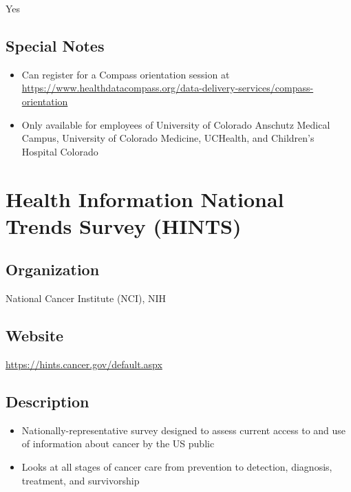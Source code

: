 \documentclass[
]{book}
\providecommand{\tightlist}{%
  \setlength{\itemsep}{0pt}\setlength{\parskip}{0pt}}
\begin{document}
Yes

\hypertarget{special-notes-30}{%
\section{Special Notes}\label{special-notes-30}}

\begin{itemize}
\tightlist
\item
  Can register for a Compass orientation session at \url{https://www.healthdatacompass.org/data-delivery-services/compass-orientation}
\item
  Only available for employees of University of Colorado Anschutz Medical Campus, University of Colorado Medicine, UCHealth, and Children's Hospital Colorado
\end{itemize}

\mainmatter

\hypertarget{health-information-national-trends-survey-hints}{%
\chapter{Health Information National Trends Survey (HINTS)}\label{health-information-national-trends-survey-hints}}

\hypertarget{organization-31}{%
\section{Organization}\label{organization-31}}

National Cancer Institute (NCI), NIH

\hypertarget{website-31}{%
\section{Website}\label{website-31}}

\url{https://hints.cancer.gov/default.aspx}

\hypertarget{description-31}{%
\section{Description}\label{description-31}}

\begin{itemize}
\tightlist
\item
  Nationally-representative survey designed to assess current access to and use of information about cancer by the US public
\item
  Looks at all stages of cancer care from prevention to detection, diagnosis, treatment, and survivorship
\end{itemize}
\end{document}
